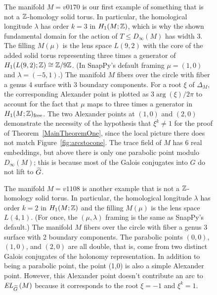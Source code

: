 \documentclass[tikz, sepfignums, defaultenums]{nmd/article}
\newcommand{\G}{G}
\newcommand{\TEL}[1]{\mathit{EL}_\Gtil\left(#1\right)}
\newcommand{\SymTEL}[1]{D_\infty\left(#1\right)}
\newcommand{\Honefree}{H_1(M; \Z)_{\mathrm{free}}}
\begin{document}
\begin{figure}
  \begin{center}
  \end{center}

  \caption{The manifold $M = v0170$ is our first example of something
    that is not a ${\mathbb Z}$-homology solid torus.  In particular, the
    homological longitude $\lambda$ has order $k=3$ in $H_1(M; {\mathbb Z})$, which
    is why the shown fundamental domain for the action of
    $T \leq \SymTEL{M}$ has width 3.  The filling $M(\mu)$ is the lens
    space $L(9, 2)$ with the core of the added solid torus
    representing three times a generator of
    $H_1(L(9, 2); {\mathbb Z}) \cong {\mathbb Z}/9{\mathbb Z}$.  (In SnapPy's default framing
    $\mu = (1,0)$ and $\lambda = (-5, 1)$.)  The manifold $M$ fibers
    over the circle with fiber a genus 4 surface with 3 boundary
    components.  For a root $\xi$ of $\Delta_M$, the corresponding
    Alexander point is plotted as $3 \arg(\xi)/ 2\pi$ to account for
    the fact that $\mu$ maps to three times a generator in
    $\Honefree$.  The two Alexander points at $(1,0)$ and $(2,0)$
    demonstrate the necessity of the hypothesis that $\xi^k \neq 1$
    for the proof of Theorem~\ref{MainTheoremOne}, since the local
    picture there does not match Figure~\ref{fig:arcstocone}.  The
    trace field of $M$ has 6 real embeddings, but above there is only
    one parabolic point modulo $\SymTEL{M}$; this is because most of
    the Galois conjugates into $\G$ do not lift to $\Gtil$.
    }
  \label{fig:v0170}
\end{figure}

\begin{figure}
  \begin{center}
  \end{center}

  \caption{The manifold $M = v1108$ is another example that is not a
    ${\mathbb Z}$-homology solid torus.  In particular, the homological
    longitude $\lambda$ has order $k=2$ in $H_1(M; {\mathbb Z})$ and the
    filling $M(\mu)$ is the lens space $L(4, 1)$. (For once, the
    $(\mu, \lambda)$ framing is the same as SnapPy's default.)  The
    manifold $M$ fibers over the circle with fiber a genus 3 surface
    with 2 boundary components.  The parabolic points $(0, 0)$,
    $(1,0)$, and $(2, 0)$ are all double, that is, come from two
    distinct Galois conjugates of the holonomy representation.  In
    addition to being a parabolic point, the point (1,0) is also a
    simple Alexander point.  However, this Alexander point doesn't
    contribute an arc to $\TEL{M}$ because it corresponds to the root
    $\xi = -1$ and $\xi^k = 1$.  }
  \label{fig:v1108}
\end{figure}
\end{document}
